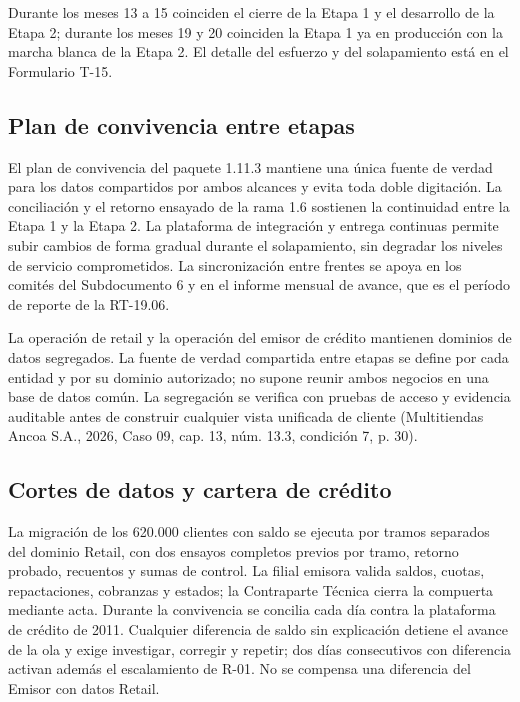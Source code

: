 \documentclass[11pt]{article}
\begin{document}
Durante los meses 13 a 15 coinciden el cierre de la Etapa 1 y el desarrollo de la Etapa 2; durante los meses 19 y 20 coinciden la Etapa 1 ya en producción con la marcha blanca de la Etapa 2. El detalle del esfuerzo y del solapamiento está en el Formulario T-15.

\subsection*{Plan de convivencia entre etapas}

El plan de convivencia del paquete 1.11.3 mantiene una única fuente de verdad para los datos compartidos por ambos alcances y evita toda doble digitación. La conciliación y el retorno ensayado de la rama 1.6 sostienen la continuidad entre la Etapa 1 y la Etapa 2. La plataforma de integración y entrega continuas permite subir cambios de forma gradual durante el solapamiento, sin degradar los niveles de servicio comprometidos. La sincronización entre frentes se apoya en los comités del Subdocumento 6 y en el informe mensual de avance, que es el período de reporte de la RT-19.06.

La operación de retail y la operación del emisor de crédito mantienen dominios de datos segregados. La fuente de verdad compartida entre etapas se define por cada entidad y por su dominio autorizado; no supone reunir ambos negocios en una base de datos común. La segregación se verifica con pruebas de acceso y evidencia auditable antes de construir cualquier vista unificada de cliente (Multitiendas Ancoa S.A., 2026, Caso 09, cap. 13, núm. 13.3, condición 7, p. 30).

\subsection*{Cortes de datos y cartera de crédito}

La migración de los 620.000 clientes con saldo se ejecuta por tramos separados del dominio Retail, con dos ensayos completos previos por tramo, retorno probado, recuentos y sumas de control. La filial emisora valida saldos, cuotas, repactaciones, cobranzas y estados; la Contraparte Técnica cierra la compuerta mediante acta. Durante la convivencia se concilia cada día contra la plataforma de crédito de 2011. Cualquier diferencia de saldo sin explicación detiene el avance de la ola y exige investigar, corregir y repetir; dos días consecutivos con diferencia activan además el escalamiento de R-01. No se compensa una diferencia del Emisor con datos Retail.
\end{document}
